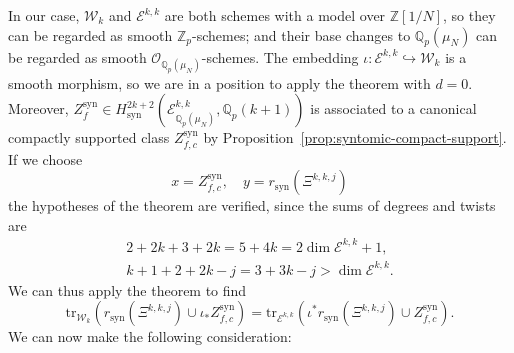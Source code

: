 \documentclass[10pt,a4paper]{amsart}
\newcommand{\Ell}{\mathcal{E}}
\newcommand{\KS}{\mathscr{W}}
\newcommand{\cBF}{\Xi}
\newcommand{\regulator}[1]{r_{#1}}
\newcommand{\rsyn}{\regulator{\syn}}
\DeclareMathOperator{\syn}{syn}
\newcommand{\Q}{\numberset{Q}}
\newcommand{\Z}{\numberset{Z}}
\newcommand{\ringint}{\mathcal}
\newcommand{\numberset}{\mathbb}
\begin{document}
   In our case, $\KS_k$ and $\Ell^{k,k}$ are both schemes with a model over $\Z[1/N]$, so they can be regarded as smooth $\Z_p$-schemes; and their base changes to $\Q_p(\mu_N)$ can be regarded as smooth $\ringint{O}_{\Q_p(\mu_N)}$-schemes. The embedding $\iota\colon \Ell^{k,k} \hookrightarrow \KS_k$ is a smooth morphism, so we are in a position to apply the theorem with $d=0$. Moreover, $Z_f^{\syn} \in H^{2k+2}_{\syn}(\Ell^{k,k}_{\Q_p(\mu_N)},\Q_p(k+1))$ is associated to a canonical compactly supported class $Z^{\syn}_{f,c}$ by Proposition~\ref{prop:syntomic-compact-support}. If we choose
   \[
       x = Z^{\syn}_{f,c}, \quad y = \rsyn(\cBF^{k,k,j})
   \]
   the hypotheses of the theorem are verified, since the sums of degrees and twists are
   \begin{gather*}
       2+2k+3+2k = 5+4k = 2\dim \Ell^{k,k} +1, \\
       k+1+2+2k-j = 3+3k-j > \dim \Ell^{k,k}.
   \end{gather*}
   We can thus apply the theorem to find
   \[
       \mathrm{tr}_{\KS_k} (\rsyn(\cBF^{k,k,j}) \cup \iota_* Z_{f,c}^{\syn}) = \mathrm{tr}_{\Ell^{k,k}} (\iota^* \rsyn(\cBF^{k,k,j}) \cup Z_{f,c}^{\syn}).
   \]
   We can now make the following consideration:
\end{document}
